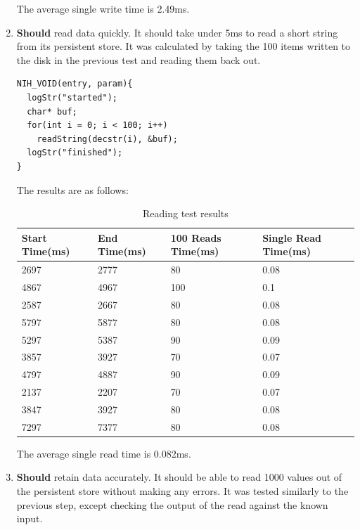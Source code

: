 \documentclass{article}
\begin{document}
\begin{enumerate}
The average single write time is 2.49ms.

\item \textbf{Should} read data quickly. It should take under 5ms to read a short string from its persistent store. It was calculated by taking the 100 items written to the disk in the previous test and reading them back out.

\begin{tcolorbox}[colback=white,grow to left by=2.5mm,grow to right by=2.5mm,left*=0mm,right*=0mm,sharp corners]
\begin{verbatim}
NIH_VOID(entry, param){
  logStr("started");
  char* buf;
  for(int i = 0; i < 100; i++)
    readString(decstr(i), &buf);
  logStr("finished");
}
\end{verbatim}
\end{tcolorbox}

The results are as follows:
\begin{table}[H]
\begin{tabular}{|l|l|l|l|}
\hline
Start Time(ms)		&End Time(ms)				&100 Reads Time(ms)		&Single Read Time(ms)		\\ \hline
2697	 & 2777	 & 80	 & 0.08\\ \hline
4867	 & 4967	 & 100	 & 0.1\\ \hline
2587	 & 2667	 & 80	 & 0.08\\ \hline
5797	 & 5877	 & 80	 & 0.08\\ \hline
5297	 & 5387	 & 90	 & 0.09\\ \hline
3857	 & 3927	 & 70	 & 0.07\\ \hline
4797	 & 4887	 & 90	 & 0.09\\ \hline
2137	 & 2207	 & 70	 & 0.07\\ \hline
3847	 & 3927	 & 80	 & 0.08\\ \hline
7297	 & 7377	 & 80	 & 0.08\\ \hline
\end{tabular}
\caption{Reading test results}
\end{table}

The average single read time is 0.082ms.

\item \textbf{Should} retain data accurately. It should be able to read 1000 values out of the persistent store without making any errors. It was tested similarly to the previous step, except checking the output of the read against the known input.


\end{enumerate}
\end{document}
